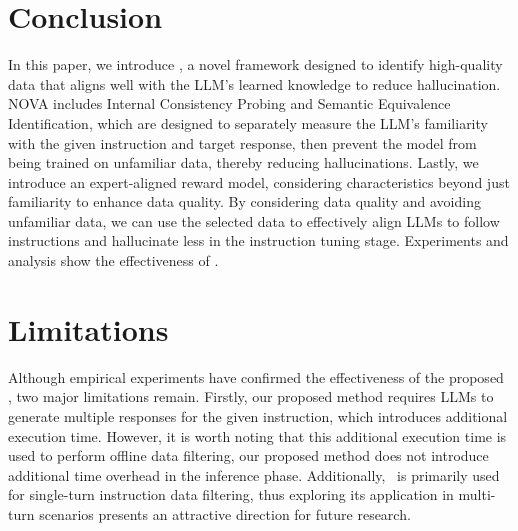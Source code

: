 \section{Conclusion}
\label{subsection:conclusion}
In this paper, we introduce \OURS, a novel framework designed to identify high-quality data that aligns well with the LLM’s learned knowledge to reduce hallucination.
NOVA includes Internal Consistency Probing and Semantic Equivalence Identification, which are designed to separately measure the LLM's familiarity with the given instruction and target response, then prevent the model from being trained on unfamiliar data, thereby reducing hallucinations.
Lastly, we introduce an expert-aligned reward model, considering characteristics beyond just familiarity to enhance data quality.
By considering data quality and avoiding unfamiliar data, we can use the selected data to effectively align LLMs to follow instructions and hallucinate less in the instruction tuning stage.
Experiments and analysis show the effectiveness of \OURS.

\section*{Limitations}
Although empirical experiments have confirmed the effectiveness of the proposed \OURS, two major limitations remain. 
Firstly, our proposed method requires LLMs to generate multiple responses for the given instruction, which introduces additional execution time.
However, it is worth noting that this additional execution time is used to perform offline data filtering, our proposed method does not introduce additional time overhead in the inference phase.
Additionally, \OURS~is primarily used for single-turn instruction data filtering, thus exploring its application in multi-turn scenarios presents an attractive direction for future research.